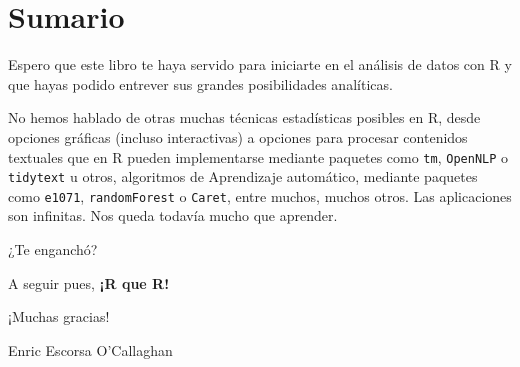 \documentclass[]{book}
\theoremstyle{definition}
\theoremstyle{definition}
\theoremstyle{remark}
\begin{document}
\chapter{Sumario}\label{sumario}

Espero que este libro te haya servido para iniciarte en el análisis de
datos con R y que hayas podido entrever sus grandes posibilidades
analíticas.

No hemos hablado de otras muchas técnicas estadísticas posibles en R,
desde opciones gráficas (incluso interactivas) a opciones para procesar
contenidos textuales que en R pueden implementarse mediante paquetes
como \texttt{tm}, \texttt{OpenNLP} o \texttt{tidytext} u otros,
algoritmos de Aprendizaje automático, mediante paquetes como
\texttt{e1071}, \texttt{randomForest} o \texttt{Caret}, entre muchos,
muchos otros. Las aplicaciones son infinitas. Nos queda todavía mucho
que aprender.

¿Te enganchó?

A seguir pues, \textbf{¡R que R!}

¡Muchas gracias!

Enric Escorsa O'Callaghan


\end{document}
